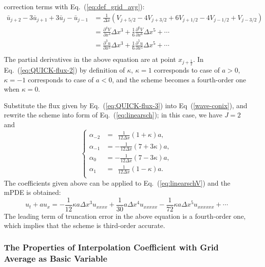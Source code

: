 \documentclass[]{article}
\def\jph{{j+\frac{1}{2}}}
\begin{document}
correction terms with Eq.~(\ref{eq:def_grid_avg}): 
\begin{equation*}
\begin{array}{ll}
\bar u_{j+2}-3\bar u_{j+1}+3\bar u_{j}-\bar u_{j-1}&
\displaystyle =\frac{1}{\Delta x}
\left(V_{j+5/2}-4V_{j+3/2}+6V_{j+1/2}-4V_{j-1/2}+V_{j-3/2}\right) \\[3mm]
&\displaystyle
=\frac{\partial^4 V}{\partial x^4}\Delta x^3+\frac{1}{6}\frac{\partial^6V}{\partial x^6}\Delta x^5 + \cdots \\[3mm]
&\displaystyle
=\frac{\partial^3 u}{\partial x^3}\Delta x^3+\frac{1}{6}\frac{\partial^5u}{\partial x^5}\Delta x^5 + \cdots \\
\end{array}
\end{equation*}
The partial derivatives in the above equation are at point $x_\jph$. In
Eq.~(\ref{eq:QUICK-flux-2}) by definition of $\kappa$, $\kappa=1$ corresponds to
case of $a>0$, $\kappa=-1$ corresponds to case of $a<0$, and the scheme becomes
a fourth-order one when $\kappa=0$.

Substitute the flux given by Eq.~(\ref{eq:QUICK-flux-3}) into
Eq~(\ref{wave-conix}), and rewrite the scheme into form of
Eq.~(\ref{eq:linearsch}); in this case, we have $J = 2$ and
\begin{equation}
\left\{\begin{array}{ll}
\alpha_{-2}&\displaystyle =\ \ \frac{1}{12\Delta x}(1+\kappa)a,\\[3mm]
\alpha_{-1}&\displaystyle = -\frac{1}{12\Delta x}(7+3\kappa)a,\\[3mm]
\alpha_{0}&\displaystyle = -\frac{1}{12\Delta x}(7-3\kappa)a,\\[3mm]
\alpha_{1}&\displaystyle =\ \ \frac{1}{12\Delta x}(1-\kappa)a.\\
\end{array}\right.
\label{eq:coeff-of-alpha-in-quick}
\end{equation}
The coefficients given above can be applied to Eq.~(\ref{eq:linearschV})
and the mPDE is obtained:
\begin{equation}
u_t+au_x =-\frac{1}{12}\kappa a \Delta x^3 u_{xxxx}+\frac{1}{30}a \Delta x^4 u_{xxxxx} -\frac{1}{72} \kappa a \Delta x^5 u_{xxxxxx} +\cdots
\label{eq:modified-quick}
\end{equation}
The leading term of truncation error in the above equation is a fourth-order
one, which implies that the scheme is third-order accurate.


\subsubsection{The Properties of Interpolation Coefficient with Grid Average as Basic Variable} \label{sec:prop-coeff-grid-avg}
\end{document}
